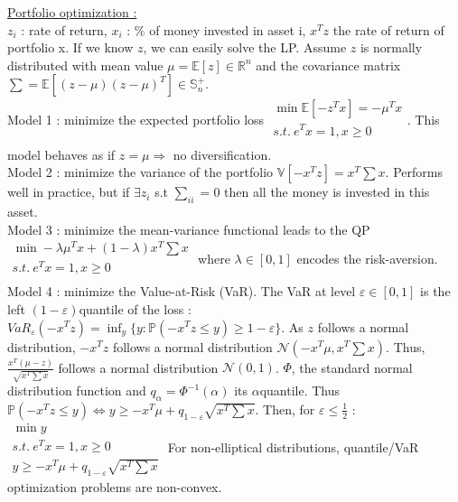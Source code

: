 \documentclass[../main.tex]{subfiles}
\begin{document}
\quad \underline{Portfolio optimization :}\\
$z_i$ : rate of return, $x_i$ : \% of money invested in asset i, $x^Tz$ the rate of return of portfolio x. If we know $z$, we can easily solve the LP. Assume $z$ is normally distributed with mean value $\mu = \mathbb{E}[z] \in \mathbb{R}^n$ and the covariance matrix $\sum = \mathbb{E}[(z-\mu)(z-\mu)^T]\in \mathbb{S}_n^+$.\\
Model 1 : minimize the expected portfolio loss $\begin{matrix}
    \min \mathbb{E}[-z^Tx] = -\mu^T x\\
    s.t. \: e^Tx =1, x\geq 0\\
\end{matrix}$. This model behaves as if $z=\mu \Rightarrow$ no diversification.\\

Model 2 : minimize the variance of the portfolio $\mathbb{V}[-x^Tz] = x^T\sum x$. Performs well in practice, but if $\exists z_i$ s.t $\sum_{ii} = 0$ then all the money is invested in this asset.\\

Model 3 : minimize the mean-variance functional leads to the QP $\begin{matrix}
    \min -\lambda \mu^Tx + (1-\lambda)x^T \sum x\\
    s.t.\: e^Tx=1, x\geq 0\\
\end{matrix}$ where $\lambda \in[0,1]$ encodes the risk-aversion. \\

Model 4 : minimize the Value-at-Risk (VaR). The VaR at level $\varepsilon \in [0,1]$ is the left $(1-\varepsilon)$quantile of the loss : $VaR_\varepsilon (-x^Tz) = \inf_y \{ y : \mathbb{P}(-x^Tz \leq y) \geq 1-\varepsilon\}$. As $z$ follows a normal distribution, $-x^Tz$ follows a normal distribution $\mathcal{N}(-x^T\mu, x^T \sum x)$. Thus, $\frac{x^T(\mu-z)}{\sqrt{x^T\sum x}}$ follows a normal distribution $\mathcal{N}(0,1)$. $\Phi$, the standard normal distribution function and $q_\alpha = \Phi^{-1}(\alpha)$ its $\alpha$quantile. Thus $\mathbb{P}(-x^Tz\leq y) \Leftrightarrow y \geq -x^T\mu + q_{1-\varepsilon} \sqrt{x^T\sum x}$. Then, for $\varepsilon\leq \frac{1}{2}$ : $\begin{matrix}
    \min y\\
    s.t. \: e^Tx = 1, x\geq 0\\
    y\geq -x^T \mu + q_{1-\varepsilon} \sqrt{x^T\sum x}
\end{matrix}$ \warning For non-elliptical distributions, quantile/VaR optimization problems are non-convex. \\
\end{document}
